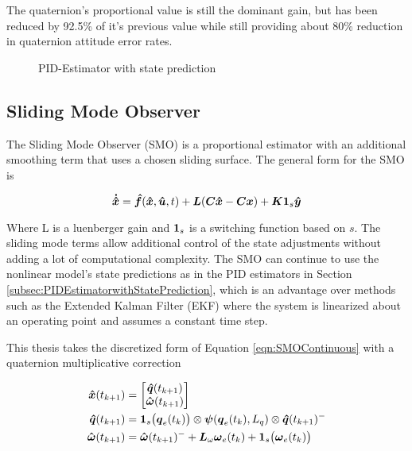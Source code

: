 The quaternion's proportional value is still the dominant gain, but has been reduced by 92.5\% of it's previous value while still providing about 80\% reduction in quaternion attitude error rates.

\begin{figure}[H]
  \centerline{}
  \caption{PID-Estimator with state prediction}
  \label{fig:PIDEstimatorwithstateprediction}
\end{figure}


\subsection{Sliding Mode Observer}
\label{subsec:SlidingModeObserver}

The Sliding Mode Observer (SMO) is a proportional estimator with an additional smoothing term that uses a chosen sliding surface.  The general form for the SMO is

\begin{equation}
  \boldsymbol{\dot{\hat{x}}} = \boldsymbol{\hat{f}}(\boldsymbol{\hat{x}}, \boldsymbol{\hat{u}}, t) + \boldsymbol{L}(\boldsymbol{C}\boldsymbol{\hat{x}} - \boldsymbol{C}\boldsymbol{x}) + \boldsymbol{K}\boldsymbol{1}_s\boldsymbol{\hat{y}}
  \label{eqn:SMOContinuous}
\end{equation}

Where L is a luenberger gain and $\boldsymbol{1}_s$ is a switching function based on $s$.  The sliding mode terms allow additional control of the state adjustments without adding a lot of computational complexity.  The SMO can continue to use the nonlinear model's state predictions as in the PID estimators in Section \ref{subsec:PIDEstimatorwithStatePrediction}, which is an advantage over methods such as the Extended Kalman Filter (EKF) where the system is linearized about an operating point and assumes a constant time step.

This thesis takes the discretized form of Equation \ref{eqn:SMOContinuous} with a quaternion multiplicative correction

\begin{subequations}
  \begin{align}
    \boldsymbol{\hat{x}}(t_{k+1}) &= \begin{bmatrix} \boldsymbol{\hat{q}}(t_{k+1}) \\ \boldsymbol{\hat{\omega}}(t_{k+1}) \end{bmatrix} \\
    \boldsymbol{\hat{q}}(t_{k+1}) &= \boldsymbol{1}_s\big(\boldsymbol{q}_{e}(t_k)\big) \otimes \boldsymbol{\psi}(\boldsymbol{q}_e(t_{k}), L_{q})  \otimes \boldsymbol{\hat{q}}(t_{k+1})^- \\
    \boldsymbol{\hat{\omega}}(t_{k+1}) &= \boldsymbol{\hat{\omega}}(t_{k+1})^- + \boldsymbol{L}_{\omega} \boldsymbol{\omega}_e(t_{k}) + \boldsymbol{1}_s \big(\boldsymbol{\omega}_e(t_{k}) \big)
  \end{align}
  \label{eqn:PIDEstimatorwithPredictionUnforcedMotion}
\end{subequations}

